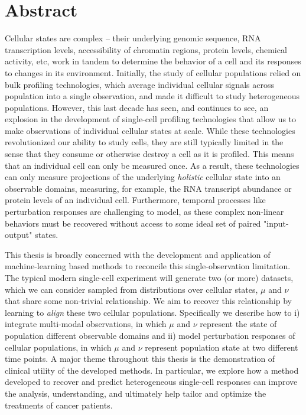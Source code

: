 
\begingroup
\let\clearpage\relax
\let\cleardoublepage\relax
\let\cleardoublepage\relax
\chapter*{Abstract}
Cellular states are complex -- their underlying genomic sequence, RNA transcription levels, accessibility of chromatin regions, protein levels, chemical activity, etc, work in tandem to determine the behavior of a cell and its responses to changes in its environment.
Initially, the study of cellular populations relied on bulk profiling technologies, which average individual cellular signals across population into a single observation, and made it difficult to study heterogeneous populations.
However, this last decade has seen, and continues to see, an explosion in the development of single-cell profiling technologies that allow us to make observations of individual cellular states at scale.
While these technologies revolutionized our ability to study cells, they are still typically limited in the sense that they consume or otherwise destroy a cell as it is profiled.
This means that an individual cell can only be measured once.
As a result, these technologies can only measure projections of the underlying \textit{holistic} cellular state into an observable domains, measuring, for example, the RNA transcript abundance or protein levels of an individual cell.
Furthermore, temporal processes like perturbation responses are challenging to model, as these complex non-linear behaviors must be recovered without access to some ideal set of paired "input-output" states.

This thesis is broadly concerned with the development and application of machine-learning based methods to reconcile this single-observation limitation.
The typical modern single-cell experiment will generate two (or more) datasets, which we can consider sampled from distributions over cellular states, $\mu$ and $\nu$ that share some non-trivial relationship.
We aim to recover this relationship by learning to \emph{align} these two cellular populations.
Specifically we describe how to
i) integrate multi-modal observations, in which $\mu$ and $\nu$ represent the state of population different observable domains
and ii) model perturbation responses of cellular populations, in which $\mu$ and $\nu$ represent population state at two different time points.
A major theme throughout this thesis is the demonstration of clinical utility of the developed methods.
In particular, we explore how a method developed to recover and predict heterogeneous single-cell responses can improve the analysis, understanding, and ultimately help tailor and optimize the treatments of cancer patients.




